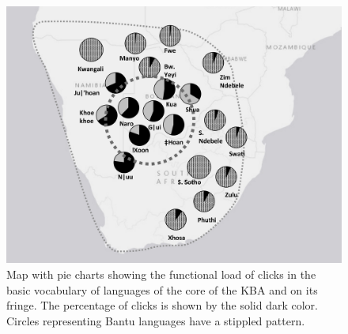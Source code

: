 \documentclass[output=paper
,newtxmath
,modfonts
,nonflat]{langsci/langscibook}
\begin{document}
\begin{figure}
\includegraphics[width=\textwidth]{figures/sands-fig3.png}
\caption{Map with pie charts showing the functional load of clicks in the basic vocabulary of languages of the core of the KBA and on its fringe. The percentage of clicks is shown by the solid dark color. Circles representing Bantu languages have a stippled pattern.} 
\label{fig:sands:3}
\end{figure}
\end{document}
